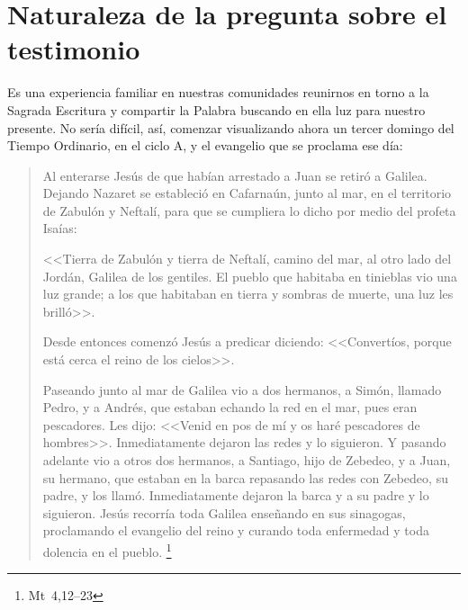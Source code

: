 \section{Naturaleza de la pregunta sobre el testimonio}
Es una experiencia familiar en nuestras comunidades reunirnos en torno a la
Sagrada Escritura y compartir la Palabra buscando en ella luz para nuestro
presente. No sería difícil, así, comenzar visualizando ahora un tercer domingo
del Tiempo Ordinario, en el ciclo A, y el evangelio que se proclama ese día:
\begin{quotation}
  Al enterarse Jesús de que habían arrestado a Juan se retiró a Galilea. Dejando
  Nazaret se estableció en Cafarnaún, junto al mar, en el territorio de Zabulón
  y Neftalí, para que se cumpliera lo dicho por medio del profeta Isaías:

  <<Tierra de Zabulón y tierra de Neftalí, camino del mar, al otro lado del
  Jordán, Galilea de los gentiles. El pueblo que habitaba en tinieblas vio una
  luz grande; a los que habitaban en tierra y sombras de muerte, una luz les
  brilló>>.

  Desde entonces comenzó Jesús a predicar diciendo: <<Convertíos, porque está
  cerca el reino de los cielos>>.

  Paseando junto al mar de Galilea vio a dos hermanos, a Simón, llamado Pedro, y
  a Andrés, que estaban echando la red en el mar, pues eran pescadores. Les
  dijo: <<Venid en pos de mí y os haré pescadores de hombres>>. Inmediatamente
  dejaron las redes y lo siguieron. Y pasando adelante vio a otros dos hermanos,
  a Santiago, hijo de Zebedeo, y a Juan, su hermano, que estaban en la barca
  repasando las redes con Zebedeo, su padre, y los llamó. Inmediatamente dejaron
  la barca y a su padre y lo siguieron. Jesús recorría toda Galilea enseñando en
  sus sinagogas, proclamando el evangelio del reino y curando toda enfermedad y
  toda dolencia en el pueblo.
  \footnote{Mt~4,12--23}
\end{quotation}

